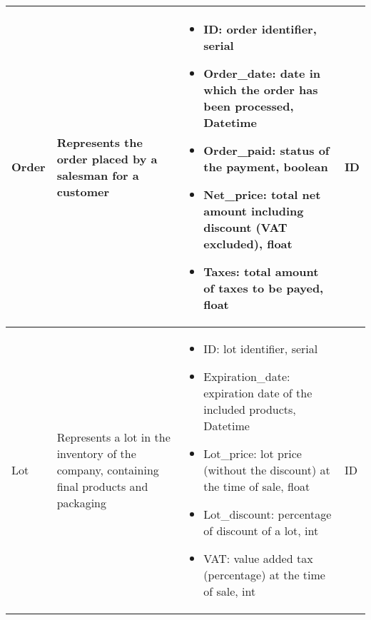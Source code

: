 \begin{longtable}{|p{}|p{} |p{}|p{} |}
    Order & Represents the order placed by a salesman for a customer &
    \begin{itemize}
        \vspace{-1em}
        \item ID:   order identifier, serial
        \item Order\_date:   date in which the order has been processed, Datetime
        \item Order\_paid:   status of the payment, boolean
        \item Net\_price:   total net amount including discount (VAT excluded), float    %
        \item Taxes:   total amount of taxes to be payed, float                     %
    \end{itemize}
    &  ID \\\hline


    Lot & Represents a lot in the inventory of the company, containing final products and packaging &
    \begin{itemize}
        \vspace{-1em}
        \item ID:   lot identifier, serial
        \item Expiration\_date:   expiration date of the included products, Datetime
        \item Lot\_price:   lot price (without the discount) at the time of sale, float
        \item Lot\_discount:   percentage of discount of a lot, int
        \item VAT:   value added tax (percentage) at the time of sale, int
    \end{itemize}
    &  ID \\\hline


\end{longtable}
